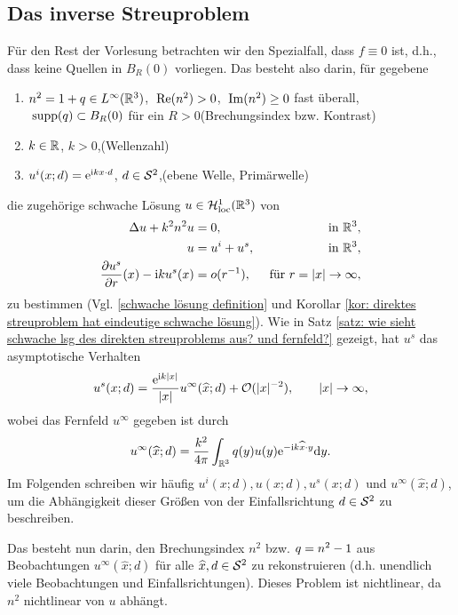 \setcounter{subsection}{7}
\setcounter{section}{8}
\setcounter{mydef}{0}
\setcounter{equation}{0}

\subsection{Das inverse Streuproblem}
Für den Rest der Vorlesung betrachten wir den Spezialfall, dass \(f\equiv0\) ist, d.h., dass keine Quellen in \(B_R(0)\) vorliegen. Das  besteht also darin, für gegebene
\begin{enumerate}[label=(\roman*)]
	\item \(n^2=1+q\in L^\infty(\mathbb{R}^3)\), \(\;\operatorname{Re}(n^2)>0\), \(\;\operatorname{Im}(n^2)\geq0\) fast überall, \(\;\operatorname{supp}(q)\subset B_R(0)\) für ein \(R>0\)\hfill(Brechungsindex bzw. Kontrast)
	\item \(k\in\mathbb{R}\), \(k>0\),\hfill(Wellenzahl)
	\item \(u^i(x;d)=\mathrm{e}^{\mathrm{i} kx\cdot d}\), \(d\in\mathcal{S}^2\),\hfill(ebene Welle, Primärwelle)
\end{enumerate}
die zugehörige schwache Lösung \(u\in\mathcal{H}_{\mathrm{loc}}^1(\mathbb{R}^3)\) von
\begin{equation}
	\label{direktes streuproblem}
	\begin{aligned}
		\Delta u+k^2n^2u&=0,&\te{ in }\R^3,\hfil\\
		u&=u^i+u^s,&\te{ in }\R^3,\\
		\frac{\p u^s}{\p r}(x)-\ii ku^s(x)&=o(r^{-1}),&\te{ für }r=|x|\to\infty,
	\end{aligned}
\end{equation}
zu bestimmen (Vgl. \eqref{schwache lösung definition} und Korollar \ref{kor: direktes streuproblem hat eindeutige schwache lösung}). Wie in Satz \ref{satz: wie sieht schwache lsg des direkten streuproblems aus? und fernfeld?} gezeigt, hat \(u^s\) das asymptotische Verhalten
\begin{equation}
	\label{asymptotisches verhalten von u^s (DP)}
	u^s(x;d)=\frac{\mathrm{e}^{\mathrm{i} k|x|}}{|x|}u^\infty(\widehat{x};d)+\mathcal{O}(|x|^{-2}),\qquad|x|\to\infty,
\end{equation}
wobei das Fernfeld \(u^\infty\) gegeben ist durch
\begin{equation}
	u^\infty(\widehat{x};d)=\frac{k^2}{4\pi}\int_{\mathbb{R}^3}q(y)u(y)\mathrm{e}^{-\mathrm{i} k\widehat{x}\cdot y}\mathrm{d}y.
\end{equation}
Im Folgenden schreiben wir häufig \(u^i(x;d), u(x;d),u^s(x;d)\) und \(u^\infty(\widehat{x};d)\), um die Abhängigkeit dieser Größen von der Einfallsrichtung \(d\in\mathcal{S}^2\) zu beschreiben.\vspace{1.5mm}

Das  besteht nun darin, den Brechungsindex \(n^2\) bzw. \(q=n^2-1\) aus Beobachtungen \(u^\infty(\widehat{x};d)\) für alle \(\widehat{x},d\in\mathcal{S}^2\) zu rekonstruieren (d.h. unendlich viele Beobachtungen und Einfallsrichtungen). Dieses Problem ist nichtlinear, da \(n^2\) nichtlinear von \(u\) abhängt.